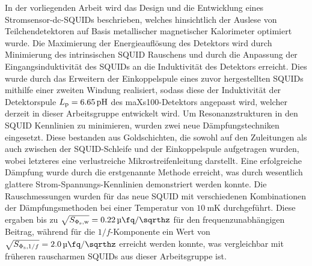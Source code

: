 \noindent
In der vorliegenden Arbeit wird das Design und die Entwicklung eines Stromsensor-dc-SQUIDs beschrieben, welches hinsichtlich der Auslese von Teilchendetektoren auf Basis metallischer magnetischer Kalorimeter optimiert wurde. Die Maximierung der Energieauflösung des Detektors wird durch Minimierung des intrinsischen SQUID Rauschens und durch die Anpassung der Eingangsinduktivität des SQUIDs an die Induktivität des Detektors erreicht. Dies wurde durch das Erweitern der Einkoppelspule eines zuvor hergestellten SQUIDs mithilfe einer zweiten Windung realisiert, sodass diese der Induktivität der Detektorspule $L_{\rm p}=\qty{6.65}{\pH}$ des maXs100-Detektors angepasst wird, welcher derzeit in dieser Arbeitsgruppe entwickelt wird. Um Resonanzstrukturen in den SQUID Kennlinien zu minimieren, wurden zwei neue Dämpfungstechniken eingesetzt. Diese bestanden aus Goldschichten, die sowohl auf den Zuleitungen als auch zwischen der SQUID-Schleife und der Einkoppelspule aufgetragen wurden, wobei letzteres eine verlustreiche Mikrostreifenleitung darstellt. Eine erfolgreiche Dämpfung wurde durch die erstgenannte Methode erreicht, was durch wesentlich glattere Strom-Spannungs-Kennlinien demonstriert werden konnte. Die Rauschmessungen wurden für das neue SQUID mit verschiedenen Kombinationen der Dämpfungsmethoden bei einer Temperatur von $\qty{10}{\milli\kelvin}$ durchgeführt. Diese ergaben bis zu $\sqrt{S_{\Phi_{\rm s}, \rm w}}=\qty{0.22}{\micro\fq\per\sqrthz}$ für den frequenzunabhängigen Beitrag, während für die $1/f$-Komponente ein Wert von $\sqrt{S_{\Phi_{\rm s}, 1/f}}=\qty{2.0}{\micro\fq\per\sqrthz}$ erreicht werden konnte, was vergleichbar mit früheren rauscharmen SQUIDs aus dieser Arbeitsgruppe ist. %



